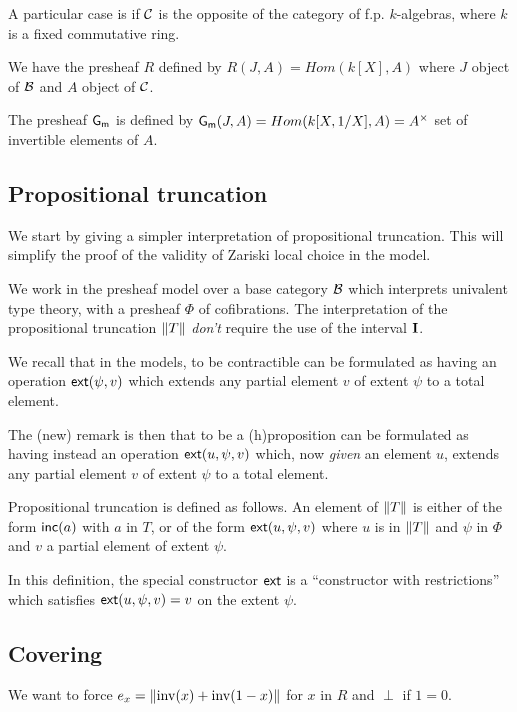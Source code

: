  A particular case is if $\mathcal{C}$ is the opposite of the category of f.p. $k$-algebras, where $k$ is a
 fixed commutative ring.

 We have the presheaf $R$ defined by $R(J,A) = Hom(k[X],A)$
 where $J$ object of $\mathcal{B}$ and $A$ object of $\mathcal{C}$.

  The presheaf $\mathsf{G_m}$ is defined by $\mathsf{G_m}(J,A) = Hom(k[X,1/X],A) = A^{\times}$
  set of invertible elements of $A$.

\subsection{Propositional truncation}

    We start by giving a simpler interpretation of propositional truncation. This will simplify
    the proof of the validity of Zariski local choice in the model.

    We work in the presheaf model over a base category $\mathcal{B}$ which interprets univalent type theory,
    with a presheaf $\Phi$ of cofibrations. The interpretation of the propositional
    truncation $\left\lVert T \right\rVert$ {\em don't} require the use of the interval $\mathbf{I}$.

    We recall that in the models, to be contractible can be formulated as having an operation
    $\mathsf{ext}(\psi,v)$ which extends any partial element $v$ of extent $\psi$ to a total element.

    The (new) remark is then that to be a (h)proposition can be formulated as having instead
    an operation 
    $\mathsf{ext}(u,\psi,v)$ which, now {\em given}
    an element $u$, extends any partial element $v$ of extent $\psi$ to a total element.

\medskip    

Propositional truncation is defined as follows. An element of $\left\lVert T \right\rVert$ is either of the form
$\mathsf{inc}(a)$ with $a$ in $T$, or of the form $\mathsf{ext}(u,\psi,v)$ where $u$ is in $\left\lVert T \right\rVert$ and $\psi$
in $\Phi$ and $v$ a partial element of extent $\psi$.

In this definition, the special constructor $\mathsf{ext}$ is a ``constructor with restrictions'' which
satisfies $\mathsf{ext}(u,\psi,v) = v$ on the extent $\psi$.

\subsection{Covering}

We want to force $e_x = \left\lVert \mathrm{inv}(x)+\mathrm{inv}(1-x) \right\rVert$ for $x$ in $R$ and $\perp$ if $1=0$.

